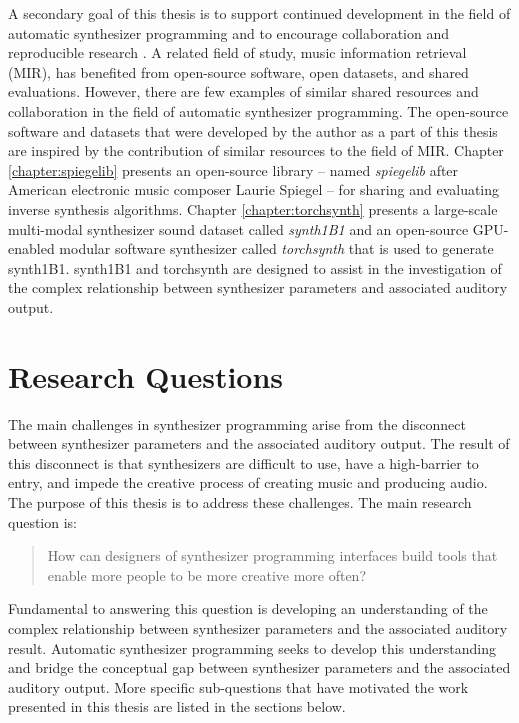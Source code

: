 A secondary goal of this thesis is to support continued development in the field of automatic synthesizer programming and to encourage collaboration and reproducible research \cite{vandewalle2009reproducible}. A related field of study, music information retrieval (MIR), has benefited from open-source software, open datasets, and shared evaluations.
However, there are few examples of similar shared resources and collaboration in the field of automatic synthesizer programming. The open-source software and datasets that were developed by the author as a part of this thesis are inspired by the contribution of similar resources to the field of MIR.  Chapter \ref{chapter:spiegelib} presents an open-source library -- named \textit{spiegelib} after American electronic music composer Laurie Spiegel -- for sharing and evaluating inverse synthesis algorithms. Chapter \ref{chapter:torchsynth} presents a large-scale multi-modal synthesizer sound dataset called \textit{synth1B1} and an open-source GPU-enabled modular software synthesizer called \textit{torchsynth} that is used to generate synth1B1. synth1B1 and torchsynth are designed to assist in the investigation of the complex relationship between synthesizer parameters and associated auditory output.


\section{Research Questions}
The main challenges in synthesizer programming arise from the disconnect between synthesizer parameters and the associated auditory output. The result of this disconnect is that synthesizers are difficult to use, have a high-barrier to entry, and impede the creative process of creating music and producing audio. The purpose of this thesis is to address these challenges. The main research question is:

\begin{quote}
	How can designers of synthesizer programming interfaces build tools that enable more people to be more creative more often? 
\end{quote}

Fundamental to answering this question is developing an understanding of the complex relationship between synthesizer parameters and the associated auditory result. Automatic synthesizer programming seeks to develop this understanding and bridge the conceptual gap between synthesizer parameters and the associated auditory output. More specific sub-questions that have motivated the work presented in this thesis are listed in the sections below.

